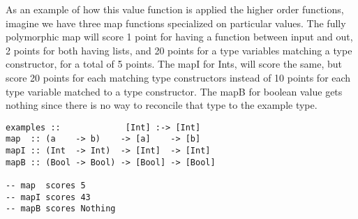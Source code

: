 As an example of how this value function is applied the higher order functions, imagine we have three map functions specialized on particular values. 
The fully polymorphic map will score 1 point for having a function between input and out, 2 points for both having lists, and 20 points for a type variables matching a type constructor, for a total of 5 points. The mapI for Ints, will score the same, but score 20 points for each matching type constructors instead of 10 points for each type variable matched to a type constructor. The mapB for boolean value gets nothing since there is no way to reconcile that type to the example type.

\begin{lstlisting}[caption=Ranking higher order function,label=horank]
examples ::             [Int] :-> [Int]
map  :: (a    -> b)    -> [a]    -> [b]
mapI :: (Int  -> Int)  -> [Int]  -> [Int]
mapB :: (Bool -> Bool) -> [Bool] -> [Bool]

-- map  scores 5
-- mapI scores 43
-- mapB scores Nothing
\end{lstlisting}
